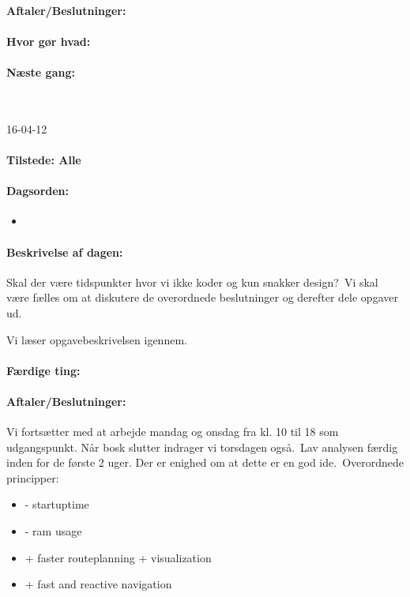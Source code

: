 \documentclass[a4paper,10pt,titlepage]{article}
\begin{document}
		\paragraph{Aftaler/Beslutninger:}
		
		\paragraph{Hvor g\o r hvad:}
		
		\paragraph{N\ae ste gang:}\mbox{}\\
		
		\begin{center}
		16-04-12
		\end{center}
		
		\paragraph{Tilstede: Alle}
		\paragraph{Dagsorden:}
		\begin{itemize}
					\item 
					
		\end{itemize}
		
		\paragraph{Beskrivelse af dagen:}
		Skal der v\ae re tidspunkter hvor vi ikke koder og kun snakker design?\
Vi skal v\ae re f\ae lles om at diskutere de overordnede beslutninger og derefter dele opgaver ud.\

Vi l\ae ser opgavebeskrivelsen igennem.

		\paragraph{F\ae rdige ting:}
		
		\paragraph{Aftaler/Beslutninger:}
		Vi forts\ae tter med at arbejde mandag og onsdag fra kl. 10 til 18 som udgangspunkt. N\aa r bosk slutter indrager vi torsdagen ogs\aa .\
		Lav analysen f\ae rdig inden for de f\o rste 2 uger. Der er enighed om at dette er en god ide.\
		Overordnede principper:
		\begin{itemize}
		\item - startuptime
		\item - ram usage
		\item + faster routeplanning + visualization
		\item + fast and reactive navigation
		\end{itemize}
			
\end{document}
